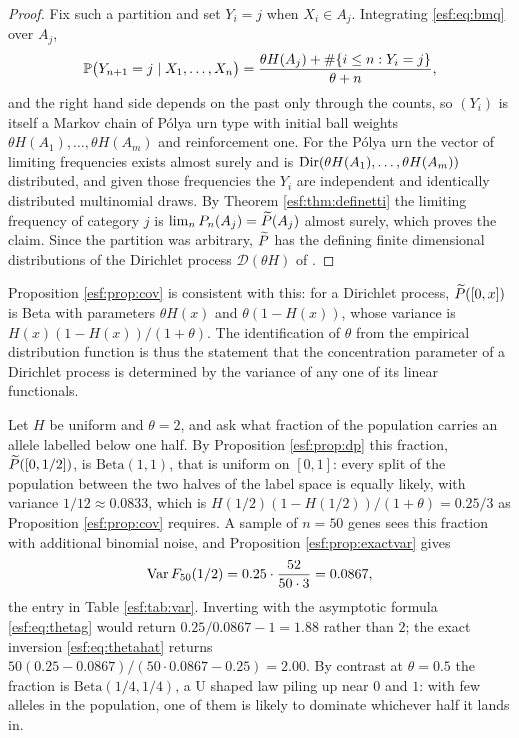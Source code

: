 \begin{proof}
Fix such a partition and set $Y_i = j$ when $X_i \in A_j$. Integrating \eqref{esf:eq:bmq}
over $A_j$,
\[
\mathbb{P}\bigl( Y_{n+1} = j \mid X_1, \dots, X_n \bigr)
= \frac{\theta H(A_j) + \#\{ i \le n : Y_i = j \}}{\theta + n},
\]
and the right hand side depends on the past only through the counts, so $(Y_i)$ is
itself a Markov chain of P\'olya urn type with initial ball weights
$\theta H(A_1), \dots, \theta H(A_m)$ and reinforcement one. For the P\'olya urn the
vector of limiting frequencies exists almost surely and is
$\operatorname{Dir}(\theta H(A_1), \dots, \theta H(A_m))$ distributed, and given those frequencies
the $Y_i$ are independent and identically distributed multinomial draws. By Theorem
\ref{esf:thm:definetti} the limiting frequency of category $j$ is
$\lim_n P_n(A_j) = \widetilde{P}(A_j)$ almost surely, which proves the claim. Since the
partition was arbitrary, $\widetilde{P}$ has the defining finite dimensional distributions of
the Dirichlet process $\mathcal{D}(\theta H)$ of \citet{esf:ferguson1973}.
\end{proof}

Proposition \ref{esf:prop:cov} is consistent with this: for a Dirichlet process,
$\widetilde{P}([0,x])$ is Beta with parameters $\theta H(x)$ and $\theta(1 - H(x))$, whose
variance is $H(x)(1-H(x))/(1+\theta)$. The identification of $\theta$ from the
empirical distribution function is thus the statement that the concentration parameter
of a Dirichlet process is determined by the variance of any one of its linear
functionals.

\begin{example}[The median allele class at $\theta = 2$]
\label{esf:ex:median}
Let $H$ be uniform and $\theta = 2$, and ask what fraction of the population carries
an allele labelled below one half. By Proposition \ref{esf:prop:dp} this fraction,
$\widetilde{P}([0,1/2])$, is $\mathrm{Beta}(1,1)$, that is uniform on $[0,1]$: every split of
the population between the two halves of the label space is equally likely, with
variance $1/12 \approx 0.0833$, which is $H(1/2)(1 - H(1/2))/(1+\theta) = 0.25/3$ as
Proposition \ref{esf:prop:cov} requires. A sample of $n = 50$ genes sees this fraction
with additional binomial noise, and Proposition \ref{esf:prop:exactvar} gives
\[
\operatorname{Var} F_{50}(1/2) = 0.25 \cdot \frac{52}{50 \cdot 3} = 0.0867,
\]
the entry in Table \ref{esf:tab:var}. Inverting with the asymptotic formula
\eqref{esf:eq:thetag} would return $0.25/0.0867 - 1 = 1.88$ rather than $2$; the exact
inversion \eqref{esf:eq:thetahat} returns $50(0.25 - 0.0867)/(50 \cdot 0.0867 - 0.25)
= 2.00$. By contrast at $\theta = 0.5$ the fraction is $\mathrm{Beta}(1/4, 1/4)$, a U
shaped law piling up near $0$ and $1$: with few alleles in the population, one of
them is likely to dominate whichever half it lands in.
\end{example}

